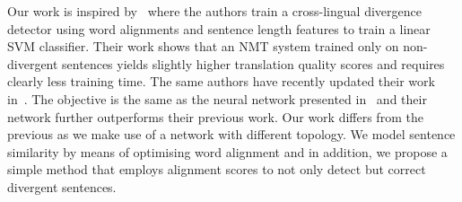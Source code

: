 \documentclass[11pt,a4paper]{article}
\begin{document}
Our work is inspired by~\cite{W17-3209} where the authors train a cross-lingual divergence detector using word alignments and sentence length features to train a linear SVM classifier. 
Their work shows that an NMT system trained only on non-divergent sentences yields slightly higher translation quality scores and requires clearly less training time. 
The same authors have recently updated their work in~\cite{DBLP:journals/corr/abs-1803-11112}. 
The objective is the same as the neural network presented in~\cite{N16-1108} and their network further outperforms their previous work. 
Our work differs from the previous as we make use of a network with different topology. 
We model sentence similarity by means of optimising word alignment and in addition, we propose a simple method that employs alignment scores to not only detect but correct divergent sentences.




\end{document}
